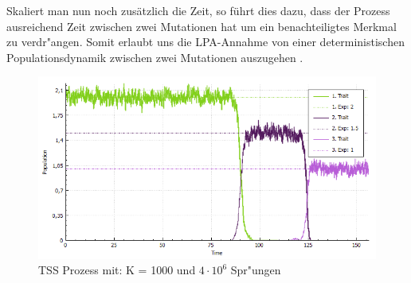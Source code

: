 \documentclass[11pt, a4paper, german]{article}
\begin{document}
	Skaliert man nun noch zusätzlich die Zeit, so führt dies dazu, dass der Prozess ausreichend Zeit zwischen zwei Mutationen hat um ein benachteiligtes Merkmal zu verdr"angen.
	Somit erlaubt uns die LPA-Annahme von einer deterministischen Populationsdynamik zwischen zwei Mutationen auszugehen \cite{raey}.\\
	\begin{figure}[H]
		\centering
		\includegraphics[width=1 \linewidth]{../BachelorArbeit/Pictures/TSS2_pure_small}
		\caption[TSS Prozess wechselnder Dominanz]{TSS Prozess mit: K = 1000 und $ 4 \cdot 10^6 $ Spr"ungen}
		\label{fig:TSS2_pure_small}
	\end{figure}
	
\end{document}
